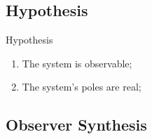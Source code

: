 
\subsection{Hypothesis}%
\label{subsec:hypothesis}

\begin{slide}{Hypothesis}
  \begin{enumerate}
    \item The system is observable;\label{item:hypo1}
    \item The system's poles are real;\label{item:hypo2}
  \end{enumerate}
\end{slide}

\subsection{Observer Synthesis}%
\label{subsec:ts-observer-synthesis}

